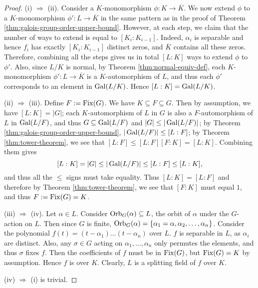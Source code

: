 \begin{proof}
	
	
	
	(i) $\Rightarrow$ (ii). Consider a $K$-monomorphism $\phi: K \to \overline{K}$. We now extend $\phi$ to a $K$-monomorphism $\phi':L \to \overline{K}$ in the same pattern as in the proof of Theorem \ref{thm:galois-group-order-upper-bound}. However, at each step, we claim that the number of ways to extend is equal to $[K_i : K_{i-1}]$. Indeed, $\alpha_i$ is separable and hence $f_i$ has exactly $[K_i : K_{i-1}]$ distinct zeros, and $\overline K$ contains all these zeros. Therefore, combining all the steps gives us in total $[L:K]$ ways to extend $\phi$ to $\phi'$. Also, since $L/K$ is normal, by Theorem \ref{thm:normal-equiv-def}, each $K$-monomorphism $\phi': L \to \overline{K}$ is a $K$-automorphism of $L$, and thus each $\phi'$ corresponds to an element in $\operatorname{Gal}(L/K)$. Hence $[L:K] = \operatorname{Gal}(L/K)$. 
	
	(ii) $\Rightarrow$ (iii). Define $F:= \operatorname{Fix}(G)$. We have $K \subseteq F \subseteq G$. Then by assumption, we have $[L:K] = |G|$; each $K$-automorphism of $L$ in $G$ is also a $F$-automorphism of $L$ in $\operatorname{Gal}(L/F)$, and thus $G \subseteq \operatorname{Gal}(L / F)$ and $|G| \le |\operatorname{Gal}(L / F)|$; by Theorem \ref{thm:galois-group-order-upper-bound}, $|\operatorname{Gal}(L/F)| \le [L:F]$; by Theorem \ref{thm:tower-theorem}, we see that $ [L:F] \le [L:F][F:K] = [L:K]$. Combining them gives $$
	[L:K] = |G| \le |\operatorname{Gal}(L/F)| \le  [L:F] \le [L:K],
	$$    
	and thus all the $\le$ signs must take equality.  
	Thus $[L:K]=[L:F]$ and therefore by Theorem \ref{thm:tower-theorem}, we see that $[F:K]$ must equal $1$, and thus $F:=\operatorname{Fix}(G) = K$.
	
	(iii) $\Rightarrow$ (iv). Let $\alpha \in L$. Consider $\operatorname{Orb}_G(\alpha) \subseteq L$, the orbit of $\alpha$ under the $G$-action on $L$. Then since $G$ is finite, $\operatorname{Orb}_G(\alpha) = \{ \alpha_1 = \alpha, \alpha_2, \ldots, \alpha_n\}$. Consider the polynomial $f(t) = (t-\alpha_1) \ldots (t-\alpha_n)$ over $L$.  $f$ is separable in $L$, as $\alpha_i$ are distinct. Also, any $\sigma \in G$ acting on $\alpha_1, \dots, \alpha_n$ only permutes the elements, and thus $\sigma$ fixes $f$. Then the coefficients of $f$ must be in $\operatorname{Fix}(G)$, but $\operatorname{Fix}(G) = K$ by assumption. Hence $f$ is over $K$. Clearly, $L$ is a splitting field of $f$ over $K$. 
	
	(iv) $\Rightarrow$ (i) is trivial.
\end{proof}


